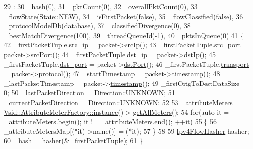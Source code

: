 \begin{DoxyCode}
29                                                         :
30     \_hash(0),
31     \_pktCount(0),
32     \_overallPktCount(0),
33     \_flowState(\hyperlink{class_vsid_common_1_1_flow_a4c78d7517903031a861c7287e706a6c2a24d459a81449d7210c8f9a86c2913034}{State::NEW}),
34     \_isFirstPacket(\textcolor{keyword}{false}),
35     \_flowClassified(\textcolor{keyword}{false}),
36     \_protocolModelDb(database),
37     \_classifiedDivergence(0),
38     \_bestMatchDivergence(100),
39     \_threadQueueId(-1),
40     \_pktsInQueue(0)
41 \{
42     \_firstPacketTuple.\hyperlink{class_vsid_common_1_1_i_pv4_tuple_a2db76e768086b4ac0aabfed850940c76}{src\_ip} = packet->\hyperlink{class_vsid_common_1_1_i_pv4_packet_ab659b369af59b2745479e9080e0a0c54}{srcIp}();
43     \_firstPacketTuple.\hyperlink{class_vsid_common_1_1_i_pv4_tuple_a68b8ec74e1abb0d15ba66c48837a1662}{src\_port} = packet->\hyperlink{class_vsid_common_1_1_i_pv4_packet_ad7f9c53e8a29a9ab3c87c28278ca7f5c}{srcPort}();
44     \_firstPacketTuple.\hyperlink{class_vsid_common_1_1_i_pv4_tuple_a21ace381c0b90771659095178d0f15af}{dst\_ip} = packet->\hyperlink{class_vsid_common_1_1_i_pv4_packet_ac70c0e7771413d5d123d57c263bcde80}{dstIp}();
45     \_firstPacketTuple.\hyperlink{class_vsid_common_1_1_i_pv4_tuple_a1c1d101406314b12ce43cc1d54177736}{dst\_port} = packet->\hyperlink{class_vsid_common_1_1_i_pv4_packet_aa61f726412de0c644df127d2cd86ef64}{dstPort}();
46     \_firstPacketTuple.\hyperlink{class_vsid_common_1_1_i_pv4_tuple_a39c4c8ec9aaa3f80d17daaefb783beec}{transport} = packet->\hyperlink{class_vsid_common_1_1_i_pv4_packet_ac1ff979633726d9f558bce1210595879}{protocol}();
47     \_startTimestamp = packet->\hyperlink{class_vsid_common_1_1_i_pv4_packet_abef9e70b733c8e5718153cb032ea6f1a}{timestamp}();
48     \_lastPacketTimestamp = packet->\hyperlink{class_vsid_common_1_1_i_pv4_packet_abef9e70b733c8e5718153cb032ea6f1a}{timestamp}();
49     \_firstOrigToDestDataSize = 0;
50     \_lastPacketDirection = \hyperlink{class_vsid_common_1_1_flow_a82b0cd313a915325b97133fd8e104781a696b031073e74bf2cb98e5ef201d4aa3}{Direction::UNKNOWN};
51     \_currentPacketDirection = \hyperlink{class_vsid_common_1_1_flow_a82b0cd313a915325b97133fd8e104781a696b031073e74bf2cb98e5ef201d4aa3}{Direction::UNKNOWN};
52 
53     \_attributeMeters = \hyperlink{class_vsid_1_1_attribute_meter_factory_a6cdacc430c359906c85ef36a7c6842fc}{Vsid::AttributeMeterFactory::instance}()->
      \hyperlink{class_vsid_1_1_attribute_meter_factory_ae44a5e19247998216c9e55112c790dea}{getAllMeters}();
54     \textcolor{keywordflow}{for}(\textcolor{keyword}{auto} it = \_attributeMeters.begin(); it != \_attributeMeters.end(); ++it)
55     \{
56         \_attributeMetersMap[(*it)->name()] = (*it);
57     \}
58 
59     \hyperlink{class_vsid_common_1_1_ipv4_flow_hasher}{Ipv4FlowHasher} hasher;
60     \_hash = hasher(&\_firstPacketTuple);
61 \}
\end{DoxyCode}


